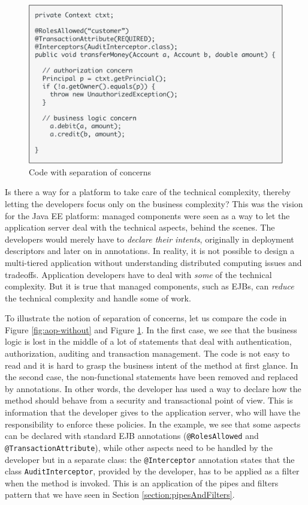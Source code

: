 \begin{figure}[]
	\centering
    \includegraphics[width=0.8\linewidth]{Figures/aop-code-with.pdf}
	\caption{Code with separation of concerns}
  \label{fig:aop-with}
\end{figure}

Is there a way for a platform to take care of the technical complexity, thereby letting the developers focus only on the business complexity? This was the vision for the \ac{Java EE} platform: managed components were seen as a way to let the application server deal with the technical aspects, behind the scenes. The developers would merely have to \emph{declare their intents}, originally in deployment descriptors and later on in annotations. In reality, it is not possible to design a multi-tiered application without understanding distributed computing issues and tradeoffs. Application developers have to deal with \emph{some} of the technical complexity. But it is true that managed components, such as \ac{EJB}s, can \emph{reduce} the technical complexity and handle some of work.

To illustrate the notion of separation of concerns, let us compare the code in Figure \ref{fig:aop-without} and Figure \ref{fig:aop-with}. In the first case, we see that the business logic is lost in the middle of a lot of statements that deal with authentication, authorization, auditing and transaction management. The code is not easy to read and it is hard to grasp the business intent of the method at first glance. In the second case, the non-functional statements have been removed and replaced by annotations. In other words, the developer has used a way to declare how the method should behave from a security and transactional point of view. This is information that the developer gives to the application server, who will have the responsibility to enforce these policies. In the example, we see that some aspects can be declared with standard \ac{EJB} annotations (\texttt{@RolesAllowed} and \texttt{@TransactionAttribute}), while other aspects need to be handled by the developer but in a separate class: the \texttt{@Interceptor} annotation states that the class \texttt{AuditInterceptor}, provided by the developer, has to be applied as a filter when the method is invoked. This is an application of the pipes and filters pattern that we have seen in Section \ref{section:pipesAndFilters}.


